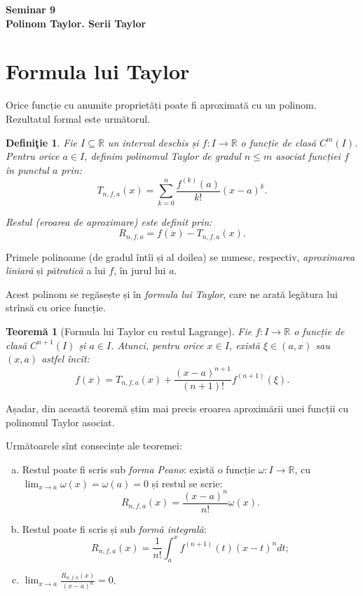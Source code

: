 \documentclass[11pt,a4paper]{article}
\newcommand\ds{\displaystyle}
\newcommand\seq{\subseteq}
\newcommand\RR{\mathbb{R}}
\theoremstyle{dotless}
\newtheorem{theorem}{Teorem\u{a}}[section]
\theoremstyle{dotlessdr}
\newtheorem{definition}{Defini\c{t}ie}[section]
\begin{document}
\begin{center}
  {\large\textbf{Seminar 9 \\ Polinom Taylor. Serii Taylor}}
\end{center}

\vspace{2cm}


\section{Formula lui Taylor}
\label{sec:taylor}


Orice funcție cu anumite proprietăți poate fi aproximată cu un polinom.
Rezultatul formal este următorul.

\begin{definition}\label{def:taylor-pol}
  Fie $I \seq \RR$ un interval deschis și $f : I \to \RR$ o funcție de clasă $C^m(I)$.
  Pentru orice $a \in I$, definim \emph{polinomul Taylor} de gradul $n \leq m$ asociat
  funcției $f$ în punctul $a$ prin:
  \[
    T_{n, f, a} (x) = \sum_{k = 0}^n \frac{f^{(k)}(a)}{k!} (x - a)^k.
  \]

  \emph{Restul} (eroarea de aproximare) este definit prin:
  \[
    R_{n, f, a} = f(x) - T_{n, f, a}(x).
  \]
\end{definition}

Primele polinoame (de gradul întîi și al doilea) se numesc, respectiv, \emph{aproximarea %
  liniară} și \emph{pătratică} a lui $f$, în jurul lui $a$.


Acest polinom se regăsește și în \emph{formula lui Taylor}, care ne arată legătura lui
strînsă cu orice funcție.

\begin{theorem}[Formula lui Taylor cu restul Lagrange]\label{thm:taylor-lagr}
  Fie $f : I \to \RR$ o funcție de clasă $C^{n+1}(I)$ și $a \in I$. Atunci, pentru orice
  $x \in I$, există $\xi \in (a, x)$ sau $(x, a)$ astfel încît:
  \[
    f(x) = T_{n, f, a}(x) + \frac{(x - a)^{n+1}}{(n + 1)!} f^{(n + 1)} (\xi).
  \]
\end{theorem}

Așadar, din această teoremă știm mai precis eroarea aproximării unei funcții cu polinomul
Taylor asociat.

Următoarele sînt consecințe ale teoremei:
\begin{enumerate}[(a)]
\item Restul poate fi scris sub \emph{forma Peano}: există o funcție $\omega : I \to \RR$,
  cu $\ds\lim_{x \to a} \omega(x) = \omega(a) = 0$ și restul se scrie:
  \[
    R_{n, f, a}(x) = \frac{(x - a)^n}{n!} \omega(x).
  \]
\item Restul poate fi scris și sub \emph{formă integrală}:
  \[
    R_{n, f, a}(x) = \frac{1}{n!} \int_a^x f^{(n + 1)}(t) (x - t)^n dt;
  \]
\item $\ds\lim_{x \to a} \frac{R_{n, f, a}(x)}{(x - a)^n} = 0$.
\end{enumerate}
\end{document}
